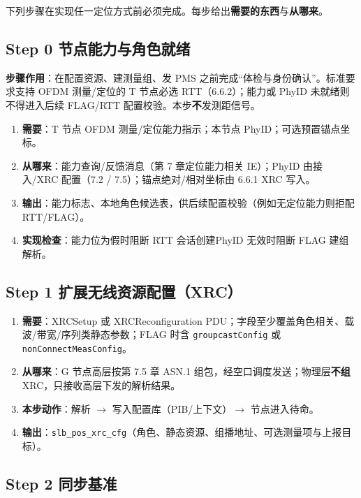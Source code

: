 \documentclass[11pt,a4paper]{ctexart}
\begin{document}
下列步骤在实现任一定位方式前必须完成。每步给出\textbf{需要的东西}与\textbf{从哪来}。

\subsection{Step 0 节点能力与角色就绪}

\textbf{步骤作用}：在配置资源、建测量组、发 PMS 之前完成``体检与身份确认''。标准要求支持 OFDM 测量/定位的 T 节点必选 RTT（6.6.2）；能力或 PhyID 未就绪则不得进入后续 FLAG/RTT 配置校验。本步\textbf{不}发测距信号。

\begin{enumerate}
  \item \textbf{需要}：T 节点 OFDM 测量/定位能力指示；本节点 PhyID；可选预置锚点坐标。
  \item \textbf{从哪来}：能力查询/反馈消息（第 7 章定位能力相关 IE）；PhyID 由接入/XRC 配置（7.2 / 7.5）；锚点绝对/相对坐标由 6.6.1 XRC 写入。
  \item \textbf{输出}：能力标志、本地角色候选表，供后续配置校验（例如无定位能力则拒配 RTT/FLAG）。
  \item \textbf{实现检查}：能力位为假时阻断 RTT 会话创建PhyID 无效时阻断 FLAG 建组解析。
\end{enumerate}

\subsection{Step 1 扩展无线资源配置（XRC）}

\begin{enumerate}
  \item \textbf{需要}：XRCSetup 或 XRCReconfiguration PDU；字段至少覆盖角色相关、载波/带宽/序列类静态参数；FLAG 时含 \texttt{groupcastConfig} 或 \texttt{nonConnectMeasConfig}。
  \item \textbf{从哪来}：G 节点高层按第 7.5 章 ASN.1 组包，经空口调度发送；物理层\textbf{不组} XRC，只接收高层下发的解析结果。
  \item \textbf{本步动作}：解析 $\rightarrow$ 写入配置库（PIB/上下文）$\rightarrow$ 节点进入待命。
  \item \textbf{输出}：\texttt{slb\_pos\_xrc\_cfg}（角色、静态资源、组播地址、可选测量项与上报目标）。
\end{enumerate}

\subsection{Step 2 同步基准}
\end{document}
